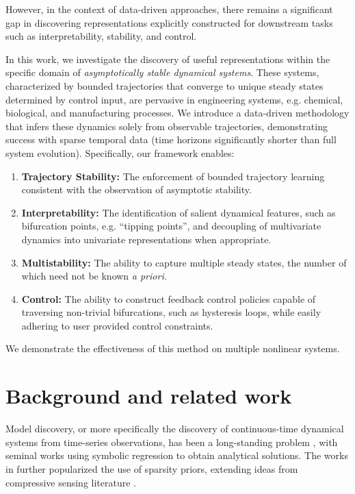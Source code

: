 \documentclass[11pt,twoside]{article}
\theoremstyle{plain}
\theoremstyle{definition}
\theoremstyle{remark}
\begin{document}
However, in the context of data-driven approaches, there remains a significant gap in discovering representations explicitly constructed for downstream tasks such as interpretability, stability, and control. 

In this work, we investigate the discovery of useful representations within the specific domain of \emph{asymptotically stable dynamical systems}. These systems, characterized by bounded trajectories that converge to unique steady states determined by control input, are pervasive in engineering systems, e.g. chemical, biological, and manufacturing processes. We introduce a data-driven methodology that infers these dynamics solely from observable trajectories, demonstrating success with sparse temporal data (time horizons significantly shorter than full system evolution). Specifically, our framework enables:
\begin{enumerate}
    \item \textbf{Trajectory Stability:} The enforcement of bounded trajectory learning consistent with the observation of asymptotic stability. 
    \item \textbf{Interpretability:} The identification of salient dynamical features, such as bifurcation points, e.g. ``tipping points'', and decoupling of multivariate dynamics into univariate representations when appropriate. 
    \item \textbf{Multistability:} The ability to capture multiple steady states, the number of which need not be known \textit{a priori.}
    \item \textbf{Control:} The ability to construct feedback control policies capable of traversing non-trivial bifurcations, such as hysteresis loops, while easily adhering to user provided control constraints. 
\end{enumerate}

We demonstrate the effectiveness of this method on multiple nonlinear systems. 


\section{Background and related work}
Model discovery, or more specifically the discovery of continuous-time dynamical systems from time-series observations, has been a long-standing problem \cite{aastrom1971system, ljung2010perspectives, keesman2011system}, with seminal works using symbolic regression \cite{bongard2007automated,schmidt2009distilling} to obtain analytical solutions. The works in \cite{wang2011,Brunton2016,rudy2017data,schaeffer2017learning} further popularized the use of sparsity priors, extending ideas from compressive sensing literature \cite{donoho2006compressed,candes2006robust,candes2008intro}. 
\end{document}
